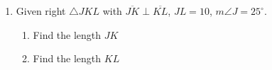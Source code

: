 \documentclass[12pt, oneside]{article}
\begin{document}
\begin{enumerate}
      \begin{multicols}{2}
        \begin{enumerate}
          \item $\sin 30^\circ = $ \vspace{1cm}
          \item $\cos 45^\circ =$ \vspace{1cm}
          \item $\tan 60^\circ =$
          \item $\sin 57^\circ = $ \vspace{1cm}
          \item $\cos 23^\circ =$ \vspace{1cm}
          \item $\tan 81^\circ =$

        \end{enumerate}
      \end{multicols} \vspace{1cm}

      \item Given right $\triangle JKL$ with $\overline{JK} \perp \overline{KL}$, $JL=10$, $m\angle J=25^\circ$.
        \begin{center}
           \vspace{1cm}
        \end{center}
        \begin{enumerate}
          \item Find the length $JK$\\[3cm]
          \item Find the length $KL$
        \end{enumerate}

\end{enumerate}
\end{document}
